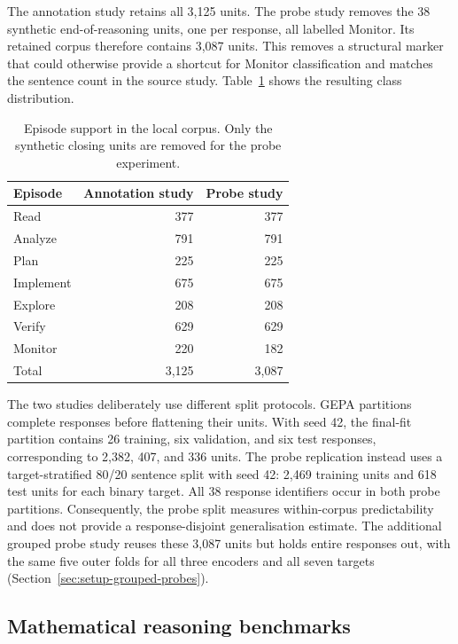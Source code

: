 \documentclass[12pt,a4paper,twoside,openright]{book}
\begin{document}
The annotation study retains all 3,125 units. The probe study removes the
38 synthetic end-of-reasoning units, one per response, all labelled
Monitor. Its retained corpus therefore contains 3,087 units. This removes a
structural marker that could otherwise provide a shortcut for Monitor
classification and matches the sentence count in the source study.
Table~\ref{tab:setup-episode-support} shows the resulting class distribution.

\begin{table}[!ht]
  \centering
  \small
  \caption{Episode support in the local corpus. Only the synthetic closing
  units are removed for the probe experiment.}
  \label{tab:setup-episode-support}
  \begin{tabular}{@{}lrr@{}}
    \toprule
    Episode & Annotation study & Probe study \\
    \midrule
    Read & 377 & 377 \\
    Analyze & 791 & 791 \\
    Plan & 225 & 225 \\
    Implement & 675 & 675 \\
    Explore & 208 & 208 \\
    Verify & 629 & 629 \\
    Monitor & 220 & 182 \\
    \midrule
    Total & 3,125 & 3,087 \\
    \bottomrule
  \end{tabular}
\end{table}

The two studies deliberately use different split protocols. GEPA partitions
complete responses before flattening their units. With seed 42, the final-fit
partition contains 26 training, six validation, and six test responses,
corresponding to 2,382, 407, and 336 units. The probe replication instead
uses a target-stratified 80/20 sentence split with seed 42: 2,469 training
units and 618 test units for each binary target. All 38 response identifiers
occur in both probe partitions. Consequently, the probe split measures
within-corpus predictability and does not provide a response-disjoint
generalisation estimate. The additional grouped probe study reuses these
3,087 units but holds entire responses out, with the same five outer folds
for all three encoders and all seven targets
(Section~\ref{sec:setup-grouped-probes}).

\subsection{Mathematical reasoning benchmarks}
\end{document}
